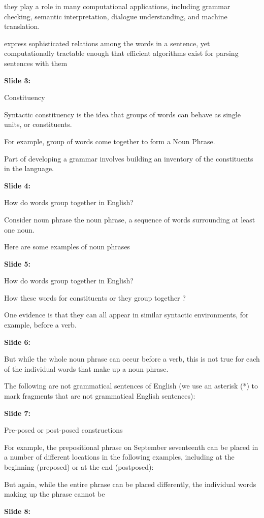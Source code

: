 \documentclass[11pt,a4paper]{article}
\begin{document}
they play a role in many computational applications, including grammar checking, semantic interpretation, dialogue understanding, and machine translation.

express sophisticated relations among the words in a sentence, yet computationally tractable enough that efficient algorithms exist for parsing sentences with them

\textbf{Slide 3:}

Constituency

Syntactic constituency is the idea that groups of words can behave as single units, or constituents.

For example, group of words come together to form a Noun Phrase.

Part of developing a grammar involves building an inventory of the constituents in the language.

\textbf{Slide 4:}

How do words group together in English?

Consider noun phrase the noun phrase, a sequence of words surrounding at least one noun.

Here are some examples of noun phrases

\textbf{Slide 5:}

How do words group together in English?

How these words for constituents or they group together ?

One evidence is that they can all appear in similar syntactic environments, for example, before a verb.

\textbf{Slide 6:}

But while the whole noun phrase can occur before a verb, this is not true for each of the individual words that make up a noun phrase.

The following are not grammatical sentences of English (we use an asterisk (*) to mark fragments that are not grammatical English sentences):

\textbf{Slide 7:}

Pre-posed or post-posed constructions

For example, the prepositional phrase on September seventeenth can be placed in a number of different locations in the following examples, including at the beginning (preposed) or at the end (postposed):

But again, while the entire phrase can be placed differently, the individual words making up the phrase cannot be

\textbf{Slide 8:}
\end{document}
